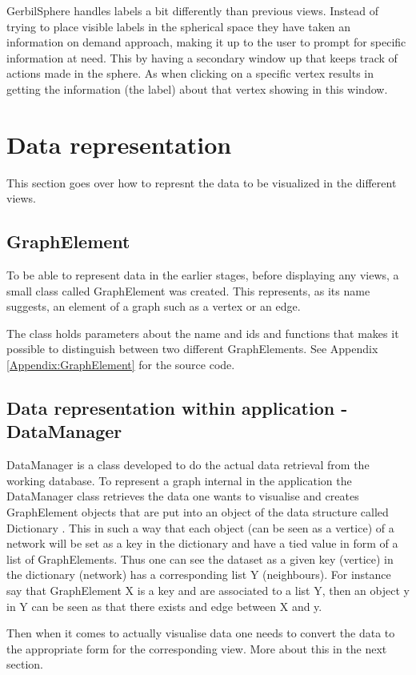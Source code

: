 \documentclass[a4paper,11pt]{kth-mag}
\begin{document}
\begin{appendices}
GerbilSphere handles labels a bit differently than previous views. Instead of trying to place visible labels in the spherical space they have taken an information on demand approach, making it up to the user to prompt for 
specific information at need. This by having a secondary window up that keeps track of actions made in the sphere. As when clicking on a specific vertex results in getting the information (the label) about that vertex showing in 
this window.
\section{Data representation}
This section goes over how to represnt the data to be visualized in the different views.
\label{Data-Rep}
\subsection{GraphElement}
To be able to represent data in the earlier stages, before displaying any views, a small class called GraphElement was created. This represents, as its name suggests, an element of a graph such as a vertex or
an edge.

The class holds parameters about the name and ids and functions that makes it possible to distinguish between two different GraphElements. See Appendix \ref{Appendix:GraphElement} for the source code.
\subsection{Data representation within application - DataManager}
DataManager is a class developed to do the actual data retrieval from the working database. To represent a graph internal in the application the DataManager class retrieves the data one wants to visualise and creates
 GraphElement objects that are put into an object of the data structure called Dictionary \cite{website:dictionary}. This in such a way that each object (can be seen as a vertice) of a network will be set as a key in the 
 dictionary and have a tied value in form of a list of GraphElements. Thus one can see the dataset as a given key (vertice) in the dictionary (network) has a corresponding list Y (neighbours). For instance say that
 GraphElement X is a key and are associated to a list Y, then an object y in Y can be seen as that there exists and edge between X and y.

Then when it comes to actually visualise data one needs to convert the data to the appropriate form for the corresponding view. More about this in the next section.

\end{appendices}
\end{document}
